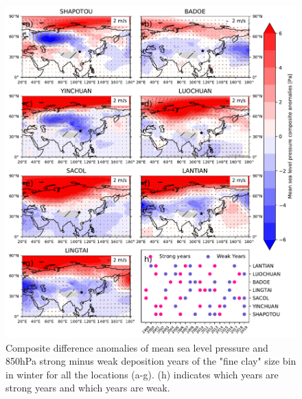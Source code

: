 \begin{figure}[hp]
    \centering
    \includegraphics[width=\columnwidth]{texfiles/figs/mslp_850hPa_2micron_DJF.pdf}
    \caption{Composite difference anomalies of mean sea level pressure and 850hPa strong minus weak deposition years of the "fine clay" size bin in winter for all the locations (a-g). (h) indicates which years are strong years and which years are weak.}
    \label{fig:DJF_850_fine_composite}
\end{figure}

